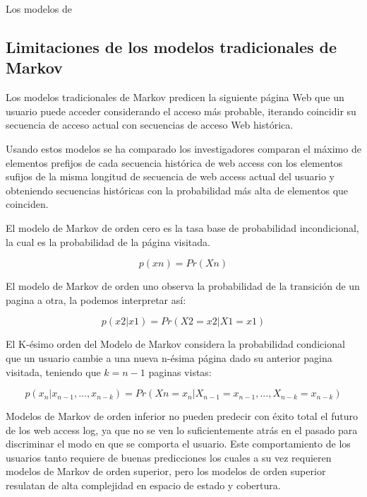 Los modelos de  

 
 
 \subsection{Limitaciones de los modelos tradicionales de Markov}
 
 
 Los modelos tradicionales de Markov predicen la siguiente página Web que un usuario puede acceder considerando el acceso más probable, iterando coincidir su secuencia de acceso actual con secuencias de acceso Web histórica.
 

 
 Usando estos modelos se ha comparado los investigadores comparan el máximo de elementos  prefijos de cada secuencia histórica de web access con los elementos sufijos de la  misma longitud de secuencia de web access actual del usuario y obteniendo secuencias históricas con la probabilidad más alta de elementos que coinciden.
 
 El modelo de Markov de orden cero es la tasa base de probabilidad incondicional, la cual es la probabilidad de la página visitada.
 
$$ p(xn) = Pr(Xn) $$
 
 
 El modelo de Markov de orden uno observa la probabilidad de la transición de un pagina a otra, la podemos interpretar así:
 
 $$ p(x2 | x1) = Pr(X2 = x2 | X1 = x1) $$
 
 El K-ésimo orden del Modelo de Markov considera la probabilidad condicional que un usuario cambie a una nueva  n-ésima página  dado su anterior pagina visitada, teniendo que $k = n -1$ paginas vistas:
 
 

$$ p( x_{n} | x_{n-1},..., x_{n-k} ) = Pr(X{n} = x_{n} | X_{n-1} = x_{n-1},..., X_{n-k} = x_{n-k})$$
 
 
 
 Modelos de Markov de orden inferior no pueden predecir con éxito total el futuro de los web access log, ya que no se ven lo suficientemente atrás en el pasado para discriminar el modo en que se comporta el usuario. Este comportamiento de los usuarios tanto requiere de buenas predicciones los cuales a su vez requieren modelos de Markov de orden superior, pero los modelos de orden superior resulatan de alta complejidad en espacio de estado y cobertura.
 
